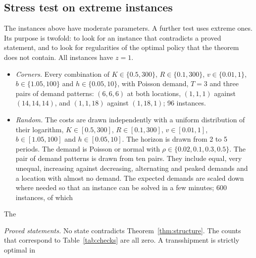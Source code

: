 \subsection{Stress test on extreme instances}\label{sec:stress}

The instances above have moderate parameters. A further test uses extreme ones. Its purpose is twofold: to look for an instance that contradicts a proved statement, and to look for regularities of the optimal policy that the theorem does not contain. All instances have $z=1$.
\begin{itemize}
\item \emph{Corners.} Every combination of $K\in\{0.5,300\}$, $R\in\{0.1,300\}$, $v\in\{0.01,1\}$, $b\in\{1.05,100\}$ and $h\in\{0.05,10\}$, with Poisson demand, $T=3$ and three pairs of demand patterns: $(6,6,6)$ at both locations, $(1,1,1)$ against $(14,14,14)$, and $(1,1,18)$ against $(1,18,1)$; 96 instances.
\item \emph{Random.} The costs are drawn independently with a uniform distribution of their logarithm, $K\in[0.5,300]$, $R\in[0.1,300]$, $v\in[0.01,1]$, $b\in[1.05,100]$ and $h\in[0.05,10]$. The horizon is drawn from 2 to 5 periods. The demand is Poisson or normal with $\rho\in\{0.02,0.1,0.3,0.5\}$. The pair of demand patterns is drawn from ten pairs. They include equal, very unequal, increasing against decreasing, alternating and peaked demands and a location with almost no demand. The expected demands are scaled down where needed so that an instance can be solved in a few minutes; 600 instances, of which %
\end{itemize}
The %

\emph{Proved statements.} No state contradicts Theorem~\ref{thm:structure}. The counts that correspond to Table~\ref{tab:checks} are all zero. A transshipment is strictly optimal in %

